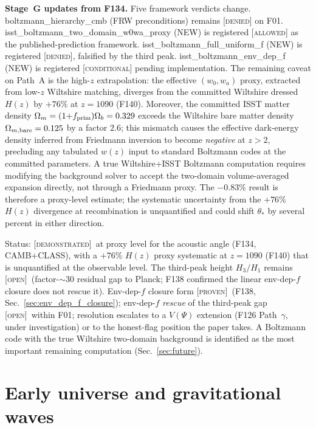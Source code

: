 \documentclass[aps,prd,twocolumn,nofootinbib,floatfix,superscriptaddress]{revtex4-2}
\newcommand{\PROVEN}{{\color{black!75!green}\textsc{[proven]}}}
\newcommand{\DEMO}{{\color{black!70!blue}\textsc{[demonstrated]}}}
\newcommand{\OPEN}{{\color{black!60!red}\textsc{[open]}}}
\newcommand{\fprim}{f_{\rm prim}}
\begin{document}
\textbf{Stage~G updates from F134.} Five framework verdicts
change. \textsf{boltzmann\_hierarchy\_cmb} (FRW preconditions)
remains \textsc{[denied]} on F01.
\textsf{isst\_boltzmann\_two\_domain\_w0wa\_proxy} (NEW) is
registered \textsc{[allowed]} as the published-prediction
framework. \textsf{isst\_boltzmann\_full\_uniform\_f} (NEW) is
registered \textsc{[denied]}, falsified by the third peak.
\textsf{isst\_boltzmann\_env\_dep\_f} (NEW) is registered
\textsc{[conditional]} pending implementation. The remaining caveat
on Path~A is the high-$z$ extrapolation: the effective $(w_0,w_a)$
proxy, extracted from low-$z$ Wiltshire matching, diverges from the
committed Wiltshire dressed $H(z)$ by $+76\%$ at $z = 1090$ (F140).
Moreover, the committed ISST matter density
$\Omega_m = (1{+}\fprim)\Omega_b = 0.329$ exceeds the Wiltshire bare
matter density $\Omega_{m,{\rm bare}} = 0.125$ by a factor $2.6$;
this mismatch causes the effective dark-energy density inferred
from Friedmann inversion to become \emph{negative} at $z > 2$,
precluding any tabulated $w(z)$ input to standard Boltzmann codes
at the committed parameters. A true Wiltshire+ISST Boltzmann
computation requires modifying the background solver to accept the
two-domain volume-averaged expansion directly, not through a
Friedmann proxy. The $-0.83\%$ result is therefore a proxy-level
estimate; the systematic uncertainty from the $+76\%$ $H(z)$
divergence at recombination is unquantified and could shift
$\theta_*$ by several percent in either direction.

Status: \DEMO\ at proxy level for the acoustic angle (F134,
CAMB+CLASS), with a $+76\%$ $H(z)$ proxy systematic at $z = 1090$
(F140) that is unquantified at the observable level. The third-peak
height $H_3/H_1$ remains \OPEN\ (factor-$\sim 30$ residual gap to
Planck; F138 confirmed the linear env-dep-$f$ closure does not
rescue it). Env-dep-$f$ closure form \PROVEN\ (F138,
Sec.~\ref{sec:env_dep_f_closure}); env-dep-$f$ \emph{rescue} of the
third-peak gap \OPEN\ within F01; resolution escalates to a
$V(\Psi)$ extension (F126 Path~$\gamma$, under investigation) or to
the honest-flag position the paper takes. A Boltzmann code with the
true Wiltshire two-domain background is identified as the most
important remaining computation (Sec.~\ref{sec:future}).

\section{Early universe and gravitational waves}
\label{sec:early}
\end{document}
